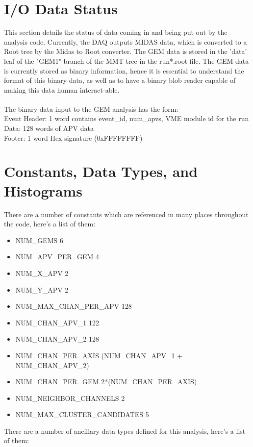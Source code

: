 \documentclass[11pt]{article}
\begin{document}
\section{I/O Data Status}
	This section details the status of data coming in and being put out by the analysis code. Currently, the DAQ outputs MIDAS data, which is converted to a Root tree by the Midas to Root converter. The GEM data is stored in the 'data' leaf of the "GEM1" branch of the MMT tree in the run*.root file. The GEM data is currently stored as binary information, hence it is essential to understand the format of this binary data, as well as to have a binary blob reader capable of making this data human interact-able.\\ \\
	The binary data input to the GEM analysis has the form:\\
	Event Header: 1 word contains event\_id, num\_apvs, VME module id  for the run \\
	Data: 128 words of APV data \\
	Footer: 1 word Hex signature (0xFFFFFFFF)
\section{Constants, Data Types, and Histograms}
There are a number of constants which are referenced in many places throughout the code, here's a list of them:

\begin{itemize}
\item NUM\_GEMS 6
\item NUM\_APV\_PER\_GEM 4
\item NUM\_X\_APV 2
\item NUM\_Y\_APV 2
\item NUM\_MAX\_CHAN\_PER\_APV 128
\item NUM\_CHAN\_APV\_1 122
\item NUM\_CHAN\_APV\_2 128
\item NUM\_CHAN\_PER\_AXIS (NUM\_CHAN\_APV\_1 + NUM\_CHAN\_APV\_2)
\item NUM\_CHAN\_PER\_GEM 2*(NUM\_CHAN\_PER\_AXIS)
\item NUM\_NEIGHBOR\_CHANNELS 2
\item NUM\_MAX\_CLUSTER\_CANDIDATES 5
\end{itemize}

There are a number of ancillary data types defined for this analysis, here's a list of them:
\end{document}
